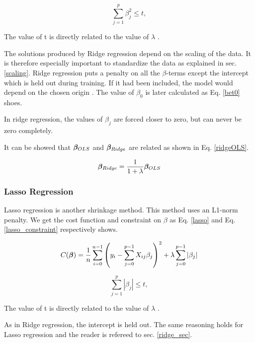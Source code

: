 \begin{equation}\label{ridge_constraint}
    \sum_{j=1}^p \beta_j^2 \leq t, 
\end{equation}

The value of t is directly related to the value of $\lambda$ \citep[p. 63]{hastie}.

The solutions produced by Ridge regression depend on the scaling of the data. It is therefore especially important to standardize the data as explained in sec. \ref{scaling}. Ridge regression puts a penalty on all the $\beta$-terms except the intercept which is held out during training. If it had been included, the model would depend on the chosen origin \citep[p. 63]{hastie}.
The value of $\beta_0$ is later calculated as Eq. \ref{bet0} shoes. 

In ridge regression, the values of $\beta_j$ are forced closer to zero, but can never be zero completely. 

It can be showed that $\boldsymbol{\beta}_{OLS}$ and $\boldsymbol{\beta}_{Ridge}$ are related as shown in Eq. \ref{ridgeOLS}. 

\begin{equation}\label{ridgeOLS}
    \boldsymbol{\beta}_{Ridge} = \frac{1}{1+\lambda}\boldsymbol{\beta}_{OLS}
\end{equation}




\subsubsection{Lasso Regression}

Lasso regression is another shrinkage method. This method uses an L1-norm penalty. We get the cost function and constraint on $\beta$ as Eq. \ref{lasso} and Eq. \ref{lasso_constraint} respectively shows. 

\begin{equation}\label{lasso}
     C(\boldsymbol{\beta}) = \frac{1}{n} \sum_{i=0}^{n-1} \left( y_i - \sum_{j=0}^{p-1} X_{ij}\beta_j \right)^2 + \lambda\sum_{j=0}^{p-1} |\beta_j|
\end{equation}

\begin{equation}\label{lasso_constraint}
    \sum_{j=1}^p | \beta_j | \leq t, 
\end{equation}


The value of t is directly related to the value of $\lambda$ \citep[p. 68]{hastie}.


As in Ridge regression, the intercept is held out. The same reasoning holds for Lasso regression and the reader is refereed to sec. \ref{ridge_sec}.

